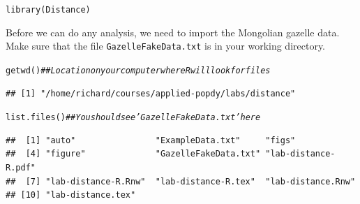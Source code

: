 \documentclass[12pt]{article}\usepackage[]{graphicx}\usepackage[]{color}
\makeatletter
\newcommand{\hlcom}[1]{\textcolor[rgb]{0.514,0.506,0.514}{\textit{#1}}}%
\newcommand{\hlstd}[1]{\textcolor[rgb]{0,0,0}{#1}}%
\newcommand{\hlkwd}[1]{\textcolor[rgb]{0.004,0.004,0.506}{#1}}%
\newenvironment{kframe}{%
 \def\at@end@of@kframe{}%
 \ifinner\ifhmode%
  \def\at@end@of@kframe{\end{minipage}}%
  \begin{minipage}{\columnwidth}%
 \fi\fi%
 \def\FrameCommand##1{\hskip\@totalleftmargin \hskip-\fboxsep
 \colorbox{shadecolor}{##1}\hskip-\fboxsep
     \hskip-\linewidth \hskip-\@totalleftmargin \hskip\columnwidth}%
 \MakeFramed {\advance\hsize-\width
   \@totalleftmargin\z@ \linewidth\hsize
   \@setminipage}}%
 {\par\unskip\endMakeFramed%
 \at@end@of@kframe}
\newenvironment{knitrout}{}{} %
\makeatother
\begin{document}
\begin{knitrout}
\color{fgcolor}\begin{kframe}
\begin{alltt}
\hlkwd{library}\hlstd{(Distance)}
\end{alltt}


{\ttfamily\noindent\itshape\color{messagecolor}{\#\# Loading required package: mrds}}

{\ttfamily\noindent\itshape\color{messagecolor}{\#\# This is mrds 2.2.5\\\#\# Built: R 4.1.0; ; 2021-11-03 14:59:40 UTC; unix}}

{\ttfamily\noindent\color{warningcolor}{\#\# Warning: replacing previous import 'lifecycle::last\_warnings' by 'rlang::last\_warnings' when loading 'pillar'}}

{\ttfamily\noindent\color{warningcolor}{\#\# Warning: replacing previous import 'lifecycle::last\_warnings' by 'rlang::last\_warnings' when loading 'tibble'}}

{\ttfamily\noindent\itshape\color{messagecolor}{\#\# \\\#\# Attaching package: 'Distance'}}

{\ttfamily\noindent\itshape\color{messagecolor}{\#\# The following object is masked from 'package:mrds':\\\#\# \\\#\# \ \ \ \ create.bins}}\end{kframe}
\end{knitrout}

Before we can do any analysis, we need to import the Mongolian gazelle
data. Make sure that the file \texttt{GazelleFakeData.txt} is in your
working directory.

\begin{knitrout}
\color{fgcolor}\begin{kframe}
\begin{alltt}
\hlkwd{getwd}\hlstd{()}       \hlcom{## Location on your computer where R will look for files}
\end{alltt}
\begin{verbatim}
## [1] "/home/richard/courses/applied-popdy/labs/distance"
\end{verbatim}
\begin{alltt}
\hlkwd{list.files}\hlstd{()}  \hlcom{## You should see 'GazelleFakeData.txt' here}
\end{alltt}
\begin{verbatim}
##  [1] "auto"                "ExampleData.txt"     "figs"               
##  [4] "figure"              "GazelleFakeData.txt" "lab-distance-R.pdf" 
##  [7] "lab-distance-R.Rnw"  "lab-distance-R.tex"  "lab-distance.Rnw"   
## [10] "lab-distance.tex"
\end{verbatim}
\end{kframe}
\end{knitrout}
\end{document}
